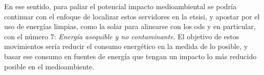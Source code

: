     En ese sentido, para paliar el potencial impacto medioambiental se podría continuar con el enfoque de localizar estos servidores en la \gls{etsisi}, y apostar por el uso de energías limpias, como la solar para alinearse con los \gls{ods} y en particular, con el número 7: \textit{Energía asequible y no contaminante}. El objetivo de estos movimientos sería reducir el consumo energético en la medida de lo posible, y basar ese consumo en fuentes de energía que tengan un impacto lo más reducido posible en el medioambiente.